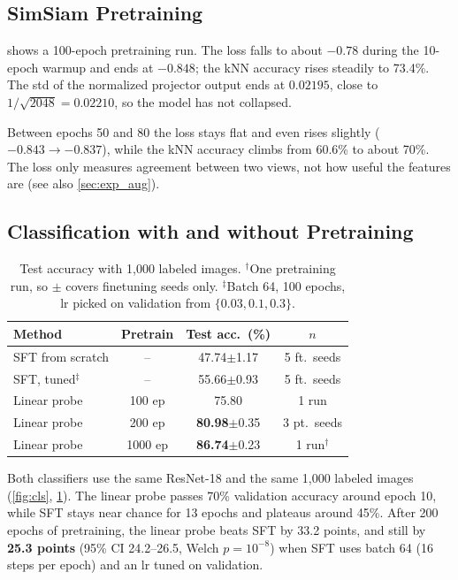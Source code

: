 \documentclass[10pt,twocolumn,letterpaper]{article}
\newcommand{\pmstd}[1]{{\scriptsize$\pm$#1}}
\begin{document}
\subsection{SimSiam Pretraining}
\label{sec:exp_pretrain}



 shows a 100-epoch pretraining run.
The loss falls to about $-0.78$ during the 10-epoch warmup and ends at $-0.848$; the kNN accuracy rises steadily to 73.4\%.
The std of the normalized projector output ends at $0.02195$, close to $1/\sqrt{2048}=0.02210$, so the model has not collapsed.

Between epochs 50 and 80 the loss stays flat and even rises slightly ($-0.843\rightarrow-0.837$), while the kNN accuracy climbs from 60.6\% to about 70\%.
The loss only measures agreement between two views, not how useful the features are (see also \cref{sec:exp_aug}).

\subsection{Classification with and without Pretraining}
\label{sec:exp_cls}



\begin{table}[t]
\centering
\small
\setlength\tabcolsep{4pt}
\begin{tabular}{lccc}
\toprule
Method & Pretrain & Test acc.\ (\%) & $n$ \\
\midrule
SFT from scratch & -- & 47.74\pmstd{1.17} & 5 ft.\ seeds \\
SFT, tuned$^\ddagger$ & -- & 55.66\pmstd{0.93} & 5 ft.\ seeds \\
Linear probe & 100 ep & 75.80 & 1 run \\
Linear probe & 200 ep & \textbf{80.98}\pmstd{0.35} & 3 pt.\ seeds \\
Linear probe & 1000 ep & \textbf{86.74}\pmstd{0.23} & 1 run$^\dagger$ \\
\bottomrule
\end{tabular}
\caption{Test accuracy with 1,000 labeled images. $^\dagger$One pretraining run, so $\pm$ covers finetuning seeds only. $^\ddagger$Batch 64, 100 epochs, lr picked on validation from $\{0.03,0.1,0.3\}$.}
\label{tab:cls}
\end{table}

Both classifiers use the same ResNet-18 and the same 1,000 labeled images (\cref{fig:cls}, \cref{tab:cls}).
The linear probe passes 70\% validation accuracy around epoch 10, while SFT stays near chance for 13 epochs and plateaus around 45\%.
After 200 epochs of pretraining, the linear probe beats SFT by 33.2 points, and still by \textbf{25.3 points} (95\% CI 24.2--26.5, Welch $p{=}10^{-8}$) when SFT uses batch 64 (16 steps per epoch) and an lr tuned on validation.
\end{document}
